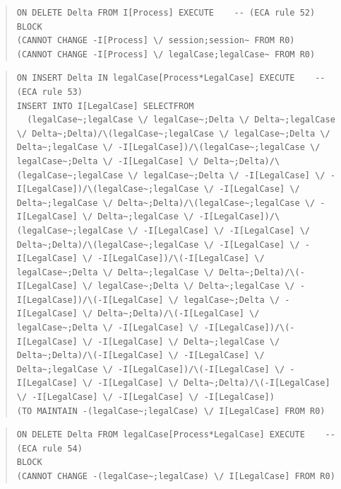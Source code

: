 \documentclass[10pt,a4paper]{report}              %
\theoremstyle{plain}\theorembodyfont{\rmfamily}\newtheorem{definition}{Definition}[section]
\theoremstyle{plain}\theorembodyfont{\rmfamily}\newtheorem{designrule}[definition]{Requirement}
\begin{document}
\begin{quote}
\begin{verbatim}
ON DELETE Delta FROM I[Process] EXECUTE    -- (ECA rule 52)
BLOCK
(CANNOT CHANGE -I[Process] \/ session;session~ FROM R0)
(CANNOT CHANGE -I[Process] \/ legalCase;legalCase~ FROM R0)
\end{verbatim}
\end{quote}
\begin{quote}
\begin{verbatim}
ON INSERT Delta IN legalCase[Process*LegalCase] EXECUTE    -- (ECA rule 53)
INSERT INTO I[LegalCase] SELECTFROM
  (legalCase~;legalCase \/ legalCase~;Delta \/ Delta~;legalCase \/ Delta~;Delta)/\(legalCase~;legalCase \/ legalCase~;Delta \/ Delta~;legalCase \/ -I[LegalCase])/\(legalCase~;legalCase \/ legalCase~;Delta \/ -I[LegalCase] \/ Delta~;Delta)/\(legalCase~;legalCase \/ legalCase~;Delta \/ -I[LegalCase] \/ -I[LegalCase])/\(legalCase~;legalCase \/ -I[LegalCase] \/ Delta~;legalCase \/ Delta~;Delta)/\(legalCase~;legalCase \/ -I[LegalCase] \/ Delta~;legalCase \/ -I[LegalCase])/\(legalCase~;legalCase \/ -I[LegalCase] \/ -I[LegalCase] \/ Delta~;Delta)/\(legalCase~;legalCase \/ -I[LegalCase] \/ -I[LegalCase] \/ -I[LegalCase])/\(-I[LegalCase] \/ legalCase~;Delta \/ Delta~;legalCase \/ Delta~;Delta)/\(-I[LegalCase] \/ legalCase~;Delta \/ Delta~;legalCase \/ -I[LegalCase])/\(-I[LegalCase] \/ legalCase~;Delta \/ -I[LegalCase] \/ Delta~;Delta)/\(-I[LegalCase] \/ legalCase~;Delta \/ -I[LegalCase] \/ -I[LegalCase])/\(-I[LegalCase] \/ -I[LegalCase] \/ Delta~;legalCase \/ Delta~;Delta)/\(-I[LegalCase] \/ -I[LegalCase] \/ Delta~;legalCase \/ -I[LegalCase])/\(-I[LegalCase] \/ -I[LegalCase] \/ -I[LegalCase] \/ Delta~;Delta)/\(-I[LegalCase] \/ -I[LegalCase] \/ -I[LegalCase] \/ -I[LegalCase])
(TO MAINTAIN -(legalCase~;legalCase) \/ I[LegalCase] FROM R0)
\end{verbatim}
\end{quote}
\begin{quote}
\begin{verbatim}
ON DELETE Delta FROM legalCase[Process*LegalCase] EXECUTE    -- (ECA rule 54)
BLOCK
(CANNOT CHANGE -(legalCase~;legalCase) \/ I[LegalCase] FROM R0)
\end{verbatim}
\end{quote}
\end{document}
